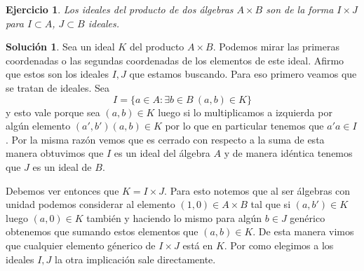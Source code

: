 \documentclass[12pt]{article}
\theoremstyle{plain}
\newtheorem{ej}{Ejercicio}
\theoremstyle{definition}
\newtheorem*{sol}{Solución}
\theoremstyle{remark}
\begin{document}
\begin{tcolorbox}[colback=teal!25!white,colframe=teal!75!black]
	\begin{ej}
		Los ideales del producto de dos álgebras $A \times B$ son de la forma $I \times J$ para $I \subset A$, $J \subset B$ ideales.
	\end{ej}	
\end{tcolorbox}
\medskip

\begin{sol}
	Sea un ideal $K$ del producto $A \times B$. Podemos mirar las primeras coordenadas o las segundas coordenadas de los elementos de este ideal. Afirmo que estos son los ideales $I,J$ que estamos buscando. Para eso primero veamos que se tratan de ideales. Sea $$I= \{ a\in A : \exists b \in B \ (a,b) \in K  \} $$ y esto vale porque sea $(a,b) \in K$ luego si lo multiplicamos a izquierda por algún elemento $(a',b')(a,b) \in K$ por lo que en particular tenemos que $a'a \in I$. Por la misma razón vemos que es cerrado con respecto a la suma de esta manera obtuvimos que $I$ es un ideal del álgebra $A$ y de manera idéntica tenemos que $J$ es un ideal de $B$.
	
	Debemos ver entonces que $K = I \times J$. Para esto notemos que al ser álgebras con unidad podemos considerar al elemento $(1,0) \in A \times B$ tal que si $(a,b') \in K$ luego $(a,0) \in K$ también y haciendo lo mismo para algún $b \in J$ genérico obtenemos que sumando estos elementos que $(a,b) \in K$. De esta manera vimos que cualquier elemento génerico de $I \times J$ está en $K$. Por como elegimos a los ideales $I,J$ la otra implicación sale directamente.

	
	
\end{sol}	
	
\end{document}
